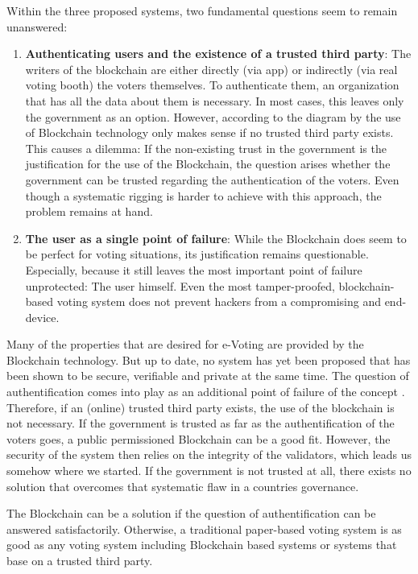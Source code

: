 Within the three proposed systems, two fundamental questions seem to remain unanswered:
\begin{enumerate}
	\item \textbf{Authenticating users and the existence of a trusted third party}: The writers of the blockchain are either directly (via app) or indirectly (via real voting booth) the voters themselves. To authenticate them, an organization that has all the data about them is necessary. In most cases, this leaves only the government as an option. However, according to the diagram by \citeauthor{Wust2017} the use of Blockchain technology only makes sense if no trusted third party exists. This causes a dilemma: If the non-existing trust in the government is the justification for the use of the Blockchain, the question arises whether the government can be trusted regarding the authentication of the voters. Even though a systematic rigging is harder to achieve with this approach, the problem remains at hand.
	\item \textbf{The user as a single point of failure}: While the Blockchain does seem to be perfect for voting situations, its justification remains questionable. Especially, because it still leaves the most important point of failure unprotected: The user himself. Even the most tamper-proofed, blockchain-based voting system does not prevent hackers from a compromising and end-device.
\end{enumerate}

Many of the properties that are desired for e-Voting are provided by the Blockchain technology. But up to date, no system has yet been proposed that has been shown to be secure, verifiable and private at the same time. The question of authentification comes into play as an additional point of failure of the concept \cite{Osgood2016} .
Therefore, if an (online) trusted third party exists, the use of the blockchain is not necessary. If the government is trusted as far as the authentification of the voters goes, a public permissioned Blockchain can be a good fit. However, the security of the system then relies on the integrity of the validators, which leads us somehow where we started. If the government is not trusted at all, there exists no solution that overcomes that systematic flaw in a countries governance.

The Blockchain can be a solution if the question of authentification can be answered satisfactorily. Otherwise, a traditional paper-based voting system is as good as any voting system including Blockchain based systems or systems that base on a trusted third party.

